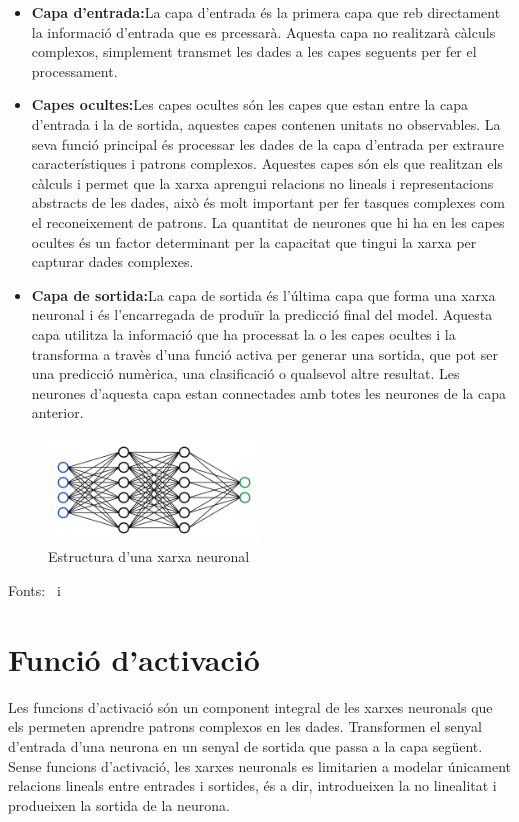 \begin{itemize}
 \item \textbf{Capa d'entrada:}La capa d'entrada és la primera capa que reb directament la informació d'entrada que es prcessarà. Aquesta capa no realitzarà càlculs complexos, simplement transmet les dades a les capes seguents per fer el processament.
 \item \textbf{Capes ocultes:}Les capes ocultes són les capes que estan entre la capa d'entrada i la de sortida, aquestes capes contenen unitats no observables. La seva funció principal és processar les dades de la capa d'entrada per extraure característiques i patrons complexos. Aquestes capes són els que realitzan els càlculs i permet que la xarxa aprengui relacions no lineals i representacions abstracts de les dades, això és molt important per fer tasques complexes com el reconeixement de patrons. La quantitat de neurones que hi ha en les capes ocultes és un factor determinant per la capacitat que tingui la xarxa per capturar dades complexes.
 \item \textbf{Capa de sortida:}La capa de sortida és l'última capa que forma una xarxa neuronal i és l'encarregada de produïr la predicció final del model. Aquesta capa utilitza la informació que ha processat la o les capes ocultes i la transforma a travès d'una funció activa per generar una sortida, que pot ser una predicció numèrica, una clasificació o qualsevol altre resultat. Les neurones d'aquesta capa estan connectades amb totes les neurones de la capa anterior.
 \end{itemize}


\begin{figure}[h!]
    \centering
    \includegraphics[width=0.5\textwidth]{./figures/xarxa.png}
    \caption{Estructura d'una xarxa neuronal}
\end{figure}

Fonts:~\cite{Hidden_layer} i~\cite{linkedin}

\section{
Funció d'activació}\label{Activació}
Les funcions d'activació són un component integral de les xarxes neuronals que els permeten aprendre patrons complexos en les dades. Transformen el senyal d'entrada d'una neurona en un senyal de sortida que passa a la capa següent. Sense funcions d'activació, les xarxes neuronals es limitarien a modelar únicament relacions lineals entre entrades i sortides, és a dir, introdueixen la no linealitat i produeixen la sortida de la neurona.

